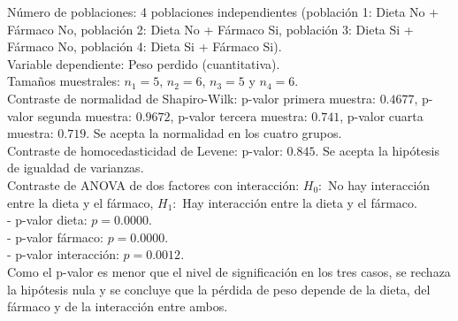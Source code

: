 \documentclass[
  a4paper,
]{scrreport}
\theoremstyle{definition}
\theoremstyle{remark}
\begin{document}
\begin{tcolorbox}[enhanced jigsaw, opacityback=0, colback=white, breakable, toprule=.15mm, colframe=quarto-callout-tip-color-frame, coltitle=black, opacitybacktitle=0.6, leftrule=.75mm, colbacktitle=quarto-callout-tip-color!10!white, bottomtitle=1mm, bottomrule=.15mm, rightrule=.15mm, titlerule=0mm, arc=.35mm, title=\textcolor{quarto-callout-tip-color}{\faLightbulb}\hspace{0.5em}{Solución}, toptitle=1mm, left=2mm]

Número de poblaciones: 4 poblaciones independientes (población 1: Dieta
No + Fármaco No, población 2: Dieta No + Fármaco Si, población 3: Dieta
Si + Fármaco No, población 4: Dieta Si + Fármaco Si).\\
Variable dependiente: Peso perdido (cuantitativa).\\
Tamaños muestrales: \(n_1=5\), \(n_2=6\), \(n_3=5\) y \(n_4=6\).\\
Contraste de normalidad de Shapiro-Wilk: p-valor primera muestra:
\(0.4677\), p-valor segunda muestra: \(0.9672\), p-valor tercera
muestra: \(0.741\), p-valor cuarta muestra: \(0.719\). Se acepta la
normalidad en los cuatro grupos.\\
Contraste de homocedasticidad de Levene: p-valor: \(0.845\). Se acepta
la hipótesis de igualdad de varianzas.\\
Contraste de ANOVA de dos factores con interacción: \(H_0:\) No hay
interacción entre la dieta y el fármaco, \(H_1:\) Hay interacción entre
la dieta y el fármaco.\\
- p-valor dieta: \(p=0.0000\).\\
- p-valor fármaco: \(p=0.0000\).\\
- p-valor interacción: \(p=0.0012\).\\
Como el p-valor es menor que el nivel de significación en los tres
casos, se rechaza la hipótesis nula y se concluye que la pérdida de peso
depende de la dieta, del fármaco y de la interacción entre ambos.

\end{tcolorbox}
\end{document}
